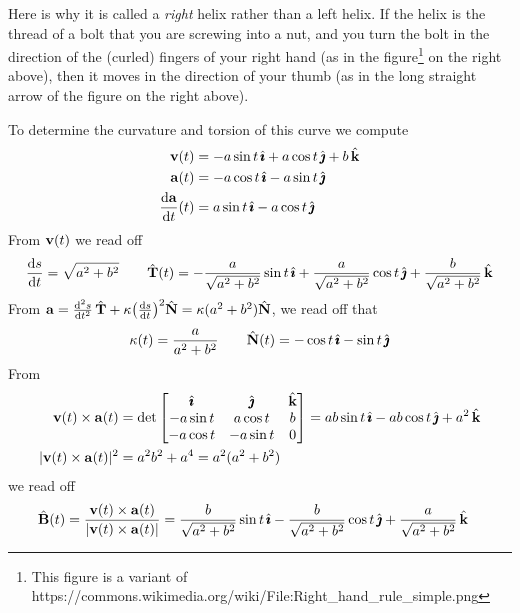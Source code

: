 \begin{eg}
\begin{efig}
\begin{center}
\end{center}
\end{efig}
Here is why it is called a \emph{right} helix 
rather than a left helix. If the helix is the thread of a bolt that you 
are screwing into a nut, and you turn the bolt in the direction of the 
(curled) fingers of your right hand 
(as in the figure\footnote{This figure is a variant of 
https:/\hskip-1pt/commons.wikimedia.org/wiki/File:Right\_hand\_rule\_simple.png
} on the right above), 
then it moves in the direction of your thumb (as 
in the long straight arrow of the figure on the right above). 

To determine the curvature and torsion of this curve we compute
\begin{align*}
\vv(t)&= -a\sin t\,\hi +a\cos t\,\hj + b\,\hk  \\
\va(t)&= -a\cos t\,\hi -a\sin t\,\hj \\
\diff{\va}{t}(t)&= a\sin t\,\hi -a\cos t\,\hj
\end{align*}
From $\mathbf{v}(t)$ we read off
\begin{align*}
\diff{s}{t}=\sqrt{a^2+b^2}\qquad
\hat\vT(t)= -\frac{a}{\sqrt{a^2+b^2}}\sin t\,\hi
           +\frac{a}{\sqrt{a^2+b^2}} \cos t\,\hj
           +\frac{b}{\sqrt{a^2+b^2}}\,\hk
\end{align*}
From $\va=\difftwo{s}{t}\,\hat\vT+\ka\big(\diff{s}{t}\big)^2\hat\vN
=\ka(a^2+b^2)\hat\vN$, we read off that
\begin{align*}
\kappa(t)=\frac{a}{a^2+b^2}\qquad
\hat{\mathbf{N}}(t) = -\cos t\,\hat{\pmb{\imath}}-\sin t\,\hat{\pmb{\jmath}}
\end{align*}
From
\begin{align*}
\mathbf{v}(t)\times\mathbf{a}(t)  &= \det\left[
                \begin{matrix}  \hat{\pmb{\imath}}   & \hat{\pmb{\jmath}}     & \hat{\mathbf{k}} \\
                             -a\sin t & a\cos t &  b \\
                             -a\cos t &-a\sin t & 0\end{matrix} \right] 
         = ab\sin t\,\hat{\pmb{\imath}} -ab\cos t\,\hat{\pmb{\jmath}} +a^2\,\hat{\mathbf{k}} \\
|\mathbf{v}(t)\times\mathbf{a}(t)|^2 &=a^2b^2+a^4 = a^2(a^2+b^2)
\end{align*}
we read off
\begin{align*}
\hat{\mathbf{B}}(t) & = \frac{\mathbf{v}(t)\times\mathbf{a}(t)}{|\mathbf{v}(t)\times\mathbf{a}(t)|}
= \frac{b}{\sqrt{a^2+b^2}}\sin t\,\hat{\pmb{\imath}}
           -\frac{b}{\sqrt{a^2+b^2}} \cos t\,\hat{\pmb{\jmath}}
           +\frac{a}{\sqrt{a^2+b^2}}\,\hat{\mathbf{k}}
\end{align*}

\end{eg}
